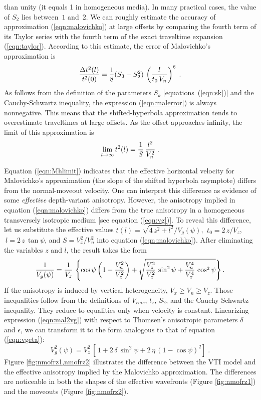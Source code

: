 than unity (it equals 1 in homogeneous media). In many 
practical cases, the value of $S_2$ lies between~$1$ and~$2$.  We can
roughly estimate the accuracy of approximation (\ref{eqn:malovichko}) at
large offsets by comparing the fourth term of its Taylor series with
the fourth term of the exact traveltime expansion (\ref{eqn:taylor}).
According to this estimate, the error of Malovichko's approximation is
\begin{equation}
{{\Delta t^2(l)} \over t^2(0)} = {1 \over 8} (S_3-S_2^2)\,
\left({l \over {t_0\,V_n}}\right)^6\;.
\label{eqn:malerror}
\end{equation}
As follows from the definition of the parameters $S_k$ 
[equations~(\ref{eqn:sk})] and the Cauchy-Schwartz inequality, the expression
(\ref{eqn:malerror}) is always nonnegative. 
This means that the shifted-hyperbola approximation
tends to overestimate traveltimes at large offsets. As the offset
approaches infinity, the limit of this approximation is 
\begin{equation}
\lim_{l \rightarrow \infty} t^2(l) = {1 \over S}\,{l^2 \over V_n^2}\;.
\label{eqn:Mhlimit}
\end{equation}
\par
Equation (\ref{eqn:Mhlimit}) indicates that the effective horizontal
velocity for Malovichko's approximation (the slope of the shifted
hyperbola asymptote) differs from the normal-moveout velocity. One 
can interpret this difference as evidence of some \emph{effective}
depth-variant anisotropy. However, the anisotropy implied in
equation (\ref{eqn:malovichko}) differs from the true anisotropy in a 
homogeneous transversely isotropic medium [see equation (\ref{eqn:vg})]. 
To reveal this difference, let us substitute
the effective values $t(l) = {\sqrt{4\,z^2 + l^2} / {V_g(\psi)}}$,
$~t_0 = {2\,z / V_z}$, $~l = 2\,z\,\tan{\psi}$, and $S = {V_x^2 / V_n^2}$ 
into equation (\ref{eqn:malovichko}). After eliminating the
variables $z$ and $l$, the result takes the form
\begin{equation}
{1 \over {V_g(\psi)}} = {1 \over V_z}\,\left\{
\cos{\psi}\left(1 - {V_n^2 \over V_x^2}\right) +
\sqrt{{V_z^2 \over V_x^2}\,\sin^2{\psi} +
{V_n^4 \over V_x^4}\,\cos^2{\psi}}\right\}.
\label{eqn:mal2vg}
\end{equation}
If the anisotropy is induced by vertical heterogeneity, $V_x \ge V_n \ge V_z$.  
Those inequalities follow from the definitions of $V_{rms}$, $t_z$,
$S_2$, and the Cauchy-Schwartz inequality. They reduce to equalities only
when velocity is constant.  Linearizing expression
(\ref{eqn:mal2vg}) with respect to Thomsen's anisotropic parameters $\delta$
and $\epsilon$, we can transform it to the form analogous to
that of equation (\ref{eqn:vgeta}):
\begin{equation}
V_g^2(\psi) = V_z^2\,\left[\,1 + 2\,\delta\,\sin^2{\psi} + 
2\,\eta\,(1 - \cos{\psi})^2\right]\;.
\label{eqn:vgvz}
\end{equation}
Figure \ref{fig:nmofrz1,nmofrz2} illustrates the difference between the VTI
model and the effective anisotropy implied by the Malovichko approximation. 
The differences are noticeable in both the shapes of the effective wavefronts
(Figure \ref{fig:nmofrz1}) and the moveouts (Figure \ref{fig:nmofrz2}).

